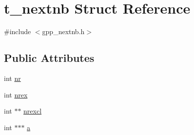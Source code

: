 \hypertarget{structt__nextnb}{\section{t\-\_\-nextnb \-Struct \-Reference}
\label{structt__nextnb}
}


{\ttfamily \#include $<$gpp\-\_\-nextnb.\-h$>$}

\subsection*{\-Public \-Attributes}
\begin{DoxyCompactItemize}
\item 
int \hyperlink{structt__nextnb_af842fa22a6f80aec83ac2ec48a335fd4}{nr}
\item 
int \hyperlink{structt__nextnb_a4d151db0282d6bf1ce3248136318fad4}{nrex}
\item 
int $\ast$$\ast$ \hyperlink{structt__nextnb_a659ce982f3339bfe925b8f2afc357f58}{nrexcl}
\item 
int $\ast$$\ast$$\ast$ \hyperlink{structt__nextnb_a83013825caa1fe8ba2e7d7c8fe3fae6d}{a}
\end{DoxyCompactItemize}



